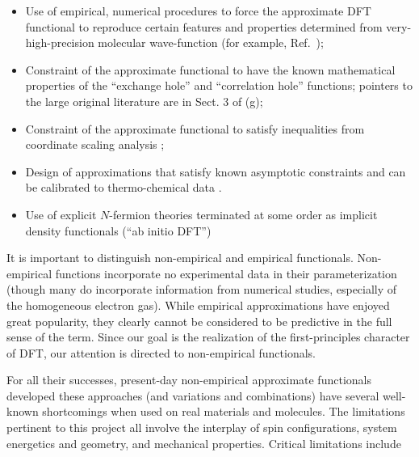 \documentclass[nofootinbib,floatfix,aps,pra,preprint]{revtex4}
\begin{document}
\begin{itemize}
\item \textrm{Use of empirical, numerical procedures to force the
approximate DFT functional to reproduce certain features and properties
determined from very-high-precision molecular wave-function (for example,
Ref.~\cite{Handy}); }

\item \textrm{Constraint of the approximate functional to have the known
mathematical properties of the ``exchange hole'' and ``correlation hole''
functions; pointers to the large original literature are in Sect. 3 of \cite%
{DFTrefs}(g); }

\item \textrm{Constraint of the approximate functional to satisfy
inequalities from coordinate scaling analysis \cite{scaling}; }

\item \textrm{Design of approximations that satisfy known asymptotic
constraints and can be calibrated to thermo-chemical data \cite{BeckeBaer}. }

\item \textrm{Use of explicit $N$-fermion theories terminated at some order
as implicit density functionals (``ab initio DFT'') \cite{RJBaiDFT} }
\end{itemize}

\textrm{It is important to distinguish non-empirical and empirical
functionals. Non-empirical functions incorporate no experimental data in
their parameterization (though many do incorporate information from
numerical studies, especially of the homogeneous electron gas). While
empirical approximations have enjoyed great popularity, they clearly cannot
be considered to be predictive in the full sense of the term. Since our goal
is the realization of the first-principles character of DFT, our attention
is directed to non-empirical functionals. }

\textrm{For all their successes, present-day non-empirical approximate
functionals developed these approaches (and variations and combinations)
have several well-known shortcomings when used on real materials and
molecules. The limitations pertinent to this project all involve the
interplay of spin configurations, system energetics and geometry, and
mechanical properties. Critical limitations include }
\end{document}
